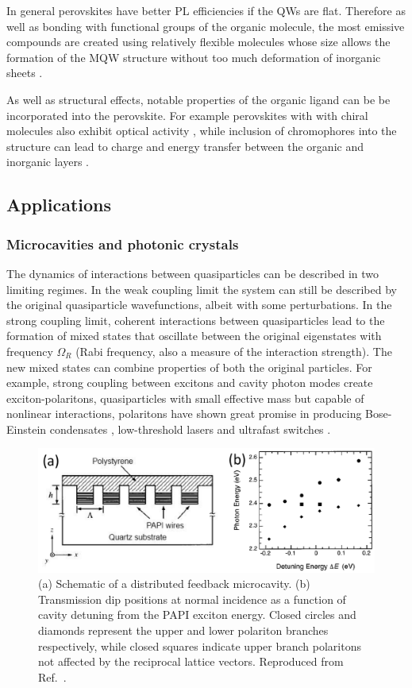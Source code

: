 In general perovskites have better PL efficiencies if the QWs are flat. Therefore as well as bonding with functional groups of the organic molecule, the most emissive compounds are created using relatively flexible molecules whose size allows the formation of the MQW structure without too much deformation of inorganic sheets \cite{Zhang2009}.

As well as structural effects, notable properties of the organic ligand can be be incorporated into the perovskite. For example perovskites with with chiral molecules also exhibit optical activity \cite{Teshima2003}, while inclusion of chromophores into the structure can lead to charge and energy transfer between the organic and inorganic layers \cite{Kawabata2009, Mitzi1999a, Braun1999}.

\subsection{Applications}
\subsubsection{Microcavities and photonic crystals}
The dynamics of interactions between quasiparticles can be described in two limiting regimes. In the weak coupling limit the system can still be described by the original quasiparticle wavefunctions, albeit with some perturbations. In the strong coupling limit, coherent interactions between quasiparticles lead to the formation of mixed states that oscillate between the original eigenstates with frequency $\Omega_R$ (Rabi frequency, also a measure of the interaction strength). The new mixed states can combine properties of both the original particles. For example, strong coupling between excitons and cavity photon modes create exciton-polaritons, quasiparticles with small effective mass but capable of nonlinear interactions, polaritons have shown great promise in producing Bose-Einstein condensates \cite{Kasprzak2006}, low-threshold lasers \cite{Christopoulos2007} and ultrafast switches \cite{Amo2010}.
\begin{figure}[h!]
\centering
\includegraphics[width=\textwidth]{Fig20}
\caption{(a) Schematic of a distributed feedback microcavity. (b) Transmission dip positions at normal incidence as a function of cavity detuning from the PAPI exciton energy. Closed circles and diamonds represent the upper and lower polariton branches respectively, while closed squares indicate upper branch polaritons not affected by the reciprocal lattice vectors. Reproduced from Ref.\ \cite{Fujita1998}.}
\label{2Fig20}
\end{figure}

